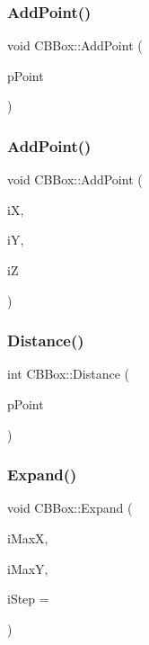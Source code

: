 \subsubsection{\texorpdfstring{AddPoint()}{AddPoint()}\hspace{0.1cm}{\footnotesize\ttfamily [1/2]}}
{\footnotesize\ttfamily void C\+B\+Box\+::\+Add\+Point (\begin{DoxyParamCaption}\item[{\mbox{\hyperlink{classCPoint}{C\+Point}} $\ast$}]{p\+Point }\end{DoxyParamCaption})}

\mbox{\label{classCBBox_a7051785c6750497f2b09d04a7aee82bd}} 
\subsubsection{\texorpdfstring{AddPoint()}{AddPoint()}\hspace{0.1cm}{\footnotesize\ttfamily [2/2]}}
{\footnotesize\ttfamily void C\+B\+Box\+::\+Add\+Point (\begin{DoxyParamCaption}\item[{int}]{iX,  }\item[{int}]{iY,  }\item[{int}]{iZ }\end{DoxyParamCaption})}

\mbox{\label{classCBBox_a010e8dd4f397c7d12e4d3a28f4952acf}} 
\subsubsection{\texorpdfstring{Distance()}{Distance()}}
{\footnotesize\ttfamily int C\+B\+Box\+::\+Distance (\begin{DoxyParamCaption}\item[{\mbox{\hyperlink{classCPoint}{C\+Point}} $\ast$}]{p\+Point }\end{DoxyParamCaption})}

\mbox{\label{classCBBox_a21b22d3678d267b74b7e49e751edd711}} 
\subsubsection{\texorpdfstring{Expand()}{Expand()}}
{\footnotesize\ttfamily void C\+B\+Box\+::\+Expand (\begin{DoxyParamCaption}\item[{int}]{i\+MaxX,  }\item[{int}]{i\+MaxY,  }\item[{int}]{i\+Step = {} }\end{DoxyParamCaption})}

